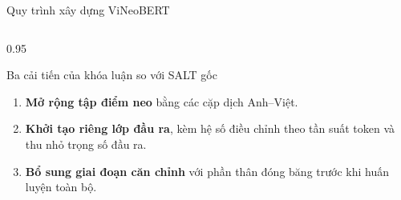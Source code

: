 \begin{frame}{Quy trình xây dựng ViNeoBERT}
{}

\vspace{1.1em}
\begin{columns}[T]
\begin{column}{0.95\textwidth}
\begin{alertblock}{Ba cải tiến của khóa luận so với SALT gốc}
  \small
  \begin{enumerate}\itemsep0pt
    \item \textbf{Mở rộng tập điểm neo} bằng các cặp dịch Anh--Việt.
    \item \textbf{Khởi tạo riêng lớp đầu ra}, kèm hệ số điều chỉnh theo tần suất
          token và thu nhỏ trọng số đầu ra.
    \item \textbf{Bổ sung giai đoạn căn chỉnh} với phần thân đóng băng trước khi
          huấn luyện toàn bộ.
  \end{enumerate}
\end{alertblock}
\end{column}
\end{columns}
\end{frame}

